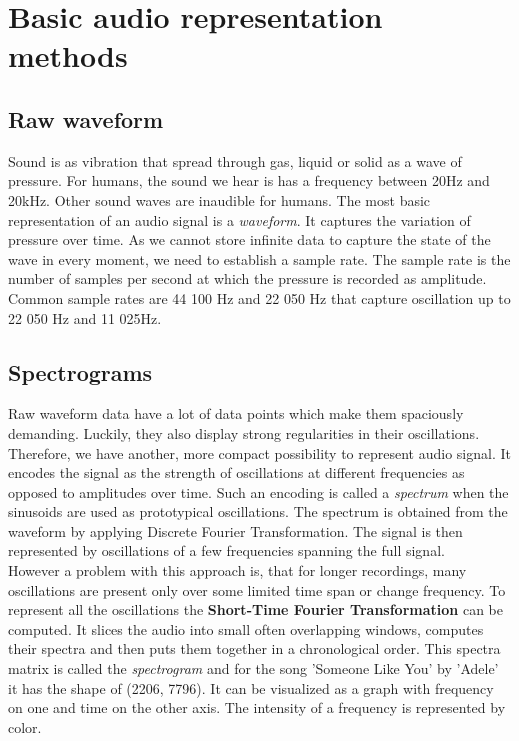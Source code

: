 \section{Basic audio representation methods}\label{sec:basic_music_representation_methods}
 

\subsection{Raw waveform}
Sound is as vibration that spread through gas, liquid or solid as a wave of pressure. For humans, the sound we hear is has a frequency between 20Hz and 20kHz. Other sound waves are inaudible for humans. The most basic representation of an audio signal is a \textit{waveform}. It captures the variation of pressure over time. As we cannot store infinite data to capture the state of the wave in every moment, we need to establish a sample rate. The sample rate is the number of samples per second at which the pressure is recorded as amplitude. Common sample rates are 44 100 Hz and 22 050 Hz that capture oscillation up to 22 050 Hz and 11 025Hz.

\subsection{Spectrograms}
Raw waveform data have a lot of data points which make them spaciously demanding. Luckily, they also display strong regularities in their oscillations. Therefore, we have another, more compact possibility to represent audio signal. It encodes the signal as the strength of oscillations at different frequencies as opposed to amplitudes over time. Such an encoding is called a \textit{spectrum} when the sinusoids are used as prototypical oscillations.
The spectrum is obtained from the waveform by applying Discrete Fourier Transformation. The signal is then represented by oscillations of a few frequencies spanning the full signal. \\
However a problem with this approach is, that for longer recordings, many oscillations are present only over some limited time span or change frequency. To represent all the oscillations the \textbf{Short-Time Fourier Transformation} can be computed. It slices the audio into small often overlapping windows, computes their spectra and then puts them together in a chronological order. This spectra matrix is called the \textit{spectrogram} and for the song 'Someone Like You' by 'Adele' it has the shape of (2206, 7796). It can be visualized as a graph with frequency on one and time on the other axis. The intensity of a frequency is represented by color.

